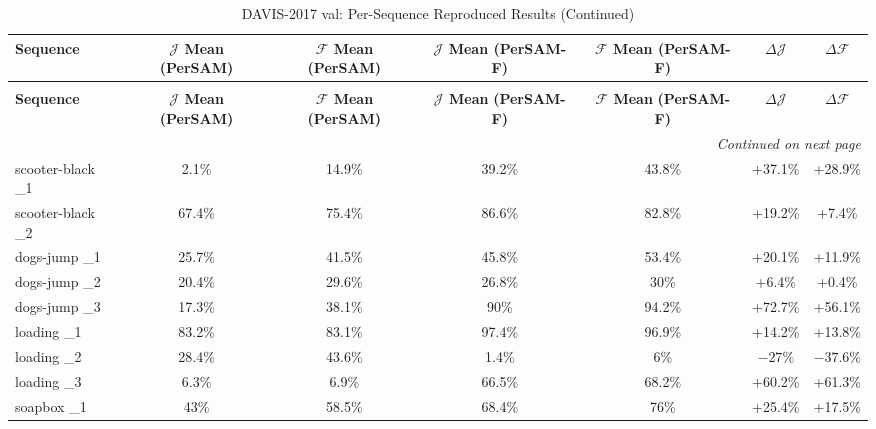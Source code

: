 \documentclass[journal,12pt,onecolumn,draftclsnofoot]{IEEEtran}
\begin{document}
\small
\setlength{\tabcolsep}{4pt}
\begin{longtable}{l c c c c c c}
\caption{DAVIS-2017 val: Per-Sequence Reproduced Results} \label{tab:davis_per_sequence} \\
\toprule
\textbf{Sequence} & \shortstack{\textbf{$\mathcal{J}$ Mean} \\ \textbf{(PerSAM)}} & \shortstack{\textbf{$\mathcal{F}$ Mean} \\ \textbf{(PerSAM)}} & \shortstack{\textbf{$\mathcal{J}$ Mean} \\ \textbf{(PerSAM-F)}} & \shortstack{\textbf{$\mathcal{F}$ Mean} \\ \textbf{(PerSAM-F)}} & \textbf{$\Delta\mathcal{J}$} & \textbf{$\Delta\mathcal{F}$} \\ \midrule
\endfirsthead
\caption[]{DAVIS-2017 val: Per-Sequence Reproduced Results (Continued)} \\
\toprule
\textbf{Sequence} & \shortstack{\textbf{$\mathcal{J}$ Mean} \\ \textbf{(PerSAM)}} & \shortstack{\textbf{$\mathcal{F}$ Mean} \\ \textbf{(PerSAM)}} & \shortstack{\textbf{$\mathcal{J}$ Mean} \\ \textbf{(PerSAM-F)}} & \shortstack{\textbf{$\mathcal{F}$ Mean} \\ \textbf{(PerSAM-F)}} & \textbf{$\Delta\mathcal{J}$} & \textbf{$\Delta\mathcal{F}$} \\ \midrule
\endhead
\midrule \multicolumn{7}{r}{\textit{Continued on next page}} \\
\endfoot
\bottomrule
\endlastfoot
scooter-black \_1 & 2.1\% & 14.9\% & 39.2\% & 43.8\% & +37.1\% & +28.9\% \\
scooter-black \_2 & 67.4\% & 75.4\% & 86.6\% & 82.8\% & +19.2\% & +7.4\% \\
dogs-jump \_1 & 25.7\% & 41.5\% & 45.8\% & 53.4\% & +20.1\% & +11.9\% \\
dogs-jump \_2 & 20.4\% & 29.6\% & 26.8\% & 30\% & +6.4\% & +0.4\% \\
dogs-jump \_3 & 17.3\% & 38.1\% & 90\% & 94.2\% & +72.7\% & +56.1\% \\
loading \_1 & 83.2\% & 83.1\% & 97.4\% & 96.9\% & +14.2\% & +13.8\% \\
loading \_2 & 28.4\% & 43.6\% & 1.4\% & 6\% & $-27\%$ & $-37.6\%$ \\
loading \_3 & 6.3\% & 6.9\% & 66.5\% & 68.2\% & +60.2\% & +61.3\% \\
soapbox \_1 & 43\% & 58.5\% & 68.4\% & 76\% & +25.4\% & +17.5\% \\

\end{longtable}
\end{document}
